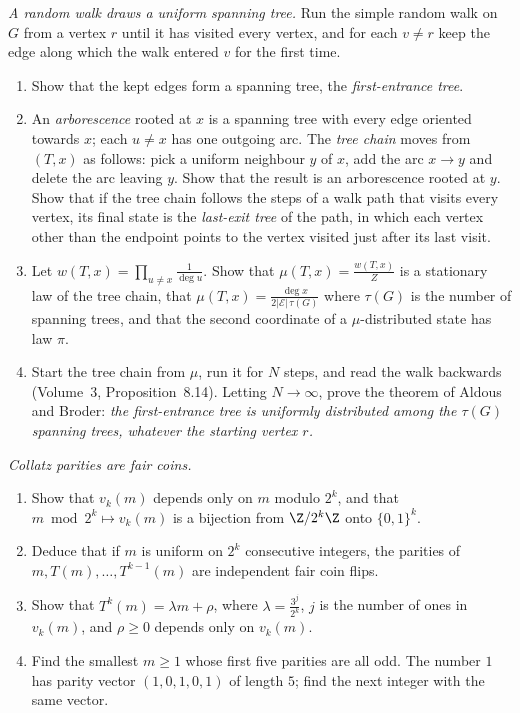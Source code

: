 \begin{exercise}[Journey]\label{pb:aldousbroder}
\emph{A random walk draws a uniform spanning tree.} Run the simple random walk on $G$ from a vertex $r$ until it has visited every vertex,
and for each $v\ne r$ keep the edge along which the walk entered $v$ for the first time.
\begin{enumerate}[label=(\alph*)]
\item Show that the kept edges form a spanning tree, the \emph{first-entrance tree}.
\item An \emph{arborescence} rooted at $x$ is a spanning tree with every edge oriented towards $x$; each $u\ne x$ has one outgoing arc. The \emph{tree chain}
moves from $(T,x)$ as follows: pick a uniform neighbour $y$ of $x$, add the arc $x\to y$ and delete the arc leaving $y$. Show that the result is an
arborescence rooted at $y$. Show that if the tree chain follows the steps of a walk path that visits every vertex, its final state is the
\emph{last-exit tree} of the path, in which each vertex other than the endpoint points to the vertex visited just after its last visit.
\item Let $w(T,x)=\prod_{u\ne x}\frac1{\deg u}$. Show that $\mu(T,x)=\frac{w(T,x)}Z$ is a stationary law of the tree chain, that $\mu(T,x)=\frac{\deg x}{2|\mathcal E|\,\tau(G)}$ where $\tau(G)$
is the number of spanning trees, and that the second coordinate of a $\mu$-distributed state has law $\pi$.
\item Start the tree chain from $\mu$, run it for $N$ steps, and read the walk backwards (Volume~3, Proposition~8.14). Letting $N\to\infty$, prove the
theorem of Aldous and Broder: \emph{the first-entrance tree is uniformly distributed among the $\tau(G)$ spanning trees, whatever the starting
vertex $r$.}
\end{enumerate}
\end{exercise}

\begin{exercise}[$\star\star$]\label{pb:terras}
\emph{Collatz parities are fair coins.}
\begin{enumerate}[label=(\alph*)]
\item Show that $v_k(m)$ depends only on $m$ modulo $2^k$, and that $m\bmod2^k\mapsto v_k(m)$ is a bijection from $\Z/2^k\Z$ onto $\{0,1\}^k$.
\item Deduce that if $m$ is uniform on $2^k$ consecutive integers, the parities of $m,T(m),\dots,T^{k-1}(m)$ are independent fair coin
flips.
\item Show that $T^k(m)=\lambda m+\rho$, where $\lambda=\frac{3^j}{2^k}$, $j$ is the number of ones in $v_k(m)$, and $\rho\ge0$ depends only on $v_k(m)$.
\item Find the smallest $m\ge1$ whose first five parities are all odd. The number $1$ has parity vector $(1,0,1,0,1)$ of length $5$; find the
next integer with the same vector.
\end{enumerate}
\end{exercise}

